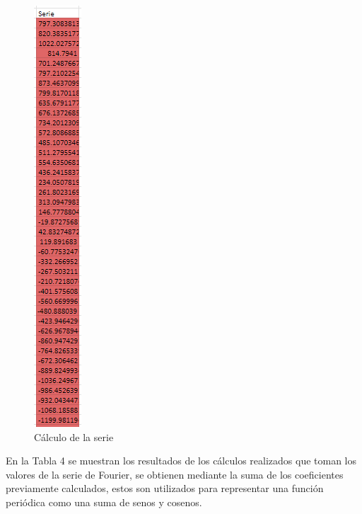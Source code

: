 \begin{figure}[H]
    \centering
    \includegraphics[width=0.69792in,height=6.19792in]{media/image28.png}
    \caption{Cálculo de la serie}
\end{figure}
En la Tabla 4 se muestran los resultados de los cálculos realizados que toman los valores de la serie de Fourier, se obtienen mediante la suma de los coeficientes previamente calculados, estos son utilizados para representar una función periódica como una suma de senos y cosenos.
